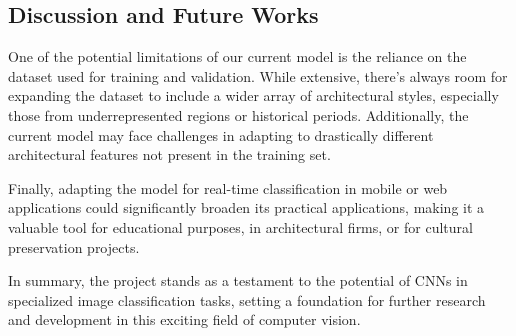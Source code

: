\documentclass{article}
\begin{document}
\subsection{Discussion and Future Works}

One of the potential limitations of our current model is the reliance on the dataset used for training and validation. While extensive, there's always room for expanding the dataset to include a wider array of architectural styles, especially those from underrepresented regions or historical periods. Additionally, the current model may face challenges in adapting to drastically different architectural features not present in the training set.

Finally, adapting the model for real-time classification in mobile or web applications could significantly broaden its practical applications, making it a valuable tool for educational purposes, in architectural firms, or for cultural preservation projects.

In summary, the project stands as a testament to the potential of CNNs in specialized image classification tasks, setting a foundation for further research and development in this exciting field of computer vision.





\end{document}
